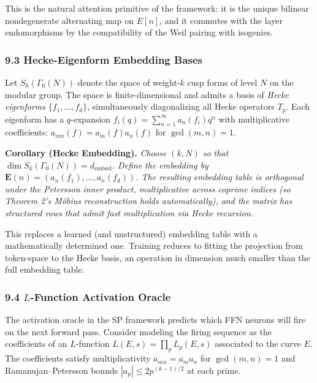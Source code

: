 \documentclass[
  11pt,
]{article}
\begin{document}
This is the natural attention primitive of the framework: it is the
unique bilinear nondegenerate alternating map on \(E[n]\), and it
commutes with the layer endomorphisms by the compatibility of the Weil
pairing with isogenies.

\hypertarget{hecke-eigenform-embedding-bases}{%
\subsubsection{9.3 Hecke-Eigenform Embedding
Bases}\label{hecke-eigenform-embedding-bases}}

Let \(S_k(\Gamma_0(N))\) denote the space of weight-\(k\) cusp forms of
level \(N\) on the modular group. The space is finite-dimensional and
admits a basis of \emph{Hecke eigenforms} \(\{f_1, \dots, f_d\}\),
simultaneously diagonalizing all Hecke operators \(T_p\). Each eigenform
has a \(q\)-expansion \(f_i(q) = \sum_{n=1}^\infty a_n(f_i) q^n\) with
multiplicative coefficients: \(a_{mn}(f) = a_m(f) a_n(f)\) for
\(\gcd(m, n) = 1\).

\textbf{Corollary (Hecke Embedding).} \emph{Choose \((k, N)\) so that
\(\dim S_k(\Gamma_0(N)) = d_{\mathrm{embed}}\). Define the embedding by
\(\mathbf{E}(n) = (a_n(f_1), \dots, a_n(f_d))\). The resulting embedding
table is orthogonal under the Petersson inner product, multiplicative
across coprime indices (so Theorem 2's Möbius reconstruction holds
automatically), and the matrix has structured rows that admit fast
multiplication via Hecke recursion.}

This replaces a learned (and unstructured) embedding table with a
mathematically determined one. Training reduces to fitting the
projection from token-space to the Hecke basis, an operation in
dimension much smaller than the full embedding table.

\hypertarget{l-function-activation-oracle}{%
\subsubsection{\texorpdfstring{9.4 \(L\)-Function Activation
Oracle}{9.4 L-Function Activation Oracle}}\label{l-function-activation-oracle}}

The activation oracle in the SP framework predicts which FFN neurons
will fire on the next forward pass. Consider modeling the firing
sequence as the coefficients of an \(L\)-function
\(L(E, s) = \prod_p L_p(E, s)\) associated to the curve \(E\). The
coefficients satisfy multiplicativity \(a_{mn} = a_m a_n\) for
\(\gcd(m, n) = 1\) and Ramanujan--Petersson bounds
\(|a_p| \leq 2 p^{(k-1)/2}\) at each prime.
\end{document}
